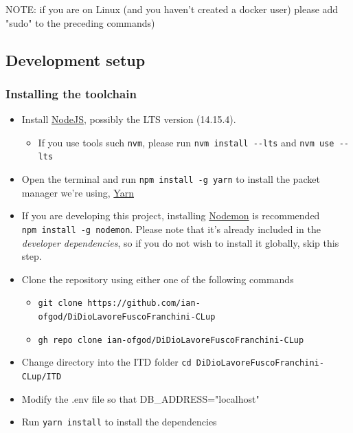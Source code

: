 \documentclass[
]{article}
\begin{document}
NOTE: if you are on Linux (and you haven't created a docker user) please add "sudo" to the preceding commands)



\subsection{Development setup}\label{dev-install}

\hypertarget{installing-the-toolchain}{%
\subsubsection{Installing the toolchain}\label{installing-the-toolchain}}

\begin{itemize}

\item
  Install \href{https://nodejs.org/}{NodeJS}, possibly the LTS version
  (14.15.4).

  \begin{itemize}
  
  \item
    If you use tools such \texttt{nvm}, please run
    \texttt{nvm\ install\ -\/-lts} and \texttt{nvm\ use\ -\/-lts}
  \end{itemize}
\item
  Open the terminal and run \texttt{npm\ install\ -g\ yarn} to install
  the packet manager we're using, \href{https://yarnpkg.com}{Yarn}
\item
  If you are developing this project, installing
  \href{https://github.com/remy/nodemon}{Nodemon} is recommended
  \texttt{npm\ install\ -g\ nodemon}. Please note that it's already
  included in the \emph{developer dependencies}, so if you do not wish
  to install it globally, skip this step.
\item
  Clone the repository using either one of the following commands

  \begin{itemize}
  
  \item
    \texttt{git\ clone\ https://github.com/ian-ofgod/DiDioLavoreFuscoFranchini-CLup}
  \item
    \texttt{gh\ repo\ clone\ ian-ofgod/DiDioLavoreFuscoFranchini-CLup}
  \end{itemize}
\item
  Change directory into the ITD folder
  \texttt{cd\ DiDioLavoreFuscoFranchini-CLup/ITD}

  \item Modify the .env file so that DB\_ADDRESS="localhost"

\item
  Run \texttt{yarn\ install} to install the dependencies
\end{itemize}
\end{document}
